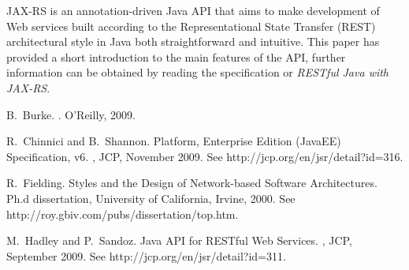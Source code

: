 \documentclass{acm_proc_article-sp}
\begin{document}
JAX-RS is an annotation-driven Java API that aims to make development of Web services built according to the Representational State Transfer\cite{rest} (REST) architectural style in Java both straightforward and intuitive. This paper has provided a short introduction to the main features of the API, further information can be obtained by reading the specification\cite{jaxrs11} or \textit{RESTful Java with JAX-RS}\cite{burke:restfuljava}.

%
\begin{thebibliography}{1}

B.~Burke.
.
\newblock O'Reilly, 2009.

R.~Chinnici and B.~Shannon.
 {Platform}, {Enterprise} {Edition} {(JavaEE)} {Specification},
  {v6}.
, JCP, November 2009.
\newblock See http://jcp.org/en/jsr/detail?id=316.

R.~Fielding.
 {Styles} and the {Design} of {Network-based}
  {Software} {Architectures}.
\newblock Ph.d dissertation, University of California, Irvine, 2000.
\newblock See http://roy.gbiv.com/pubs/dissertation/top.htm.

M.~Hadley and P.~Sandoz.
 {Java} {API} for {RESTful} {Web} {Services}.
, JCP, September 2009.
\newblock See http://jcp.org/en/jsr/detail?id=311.

\end{thebibliography}
\end{document}
